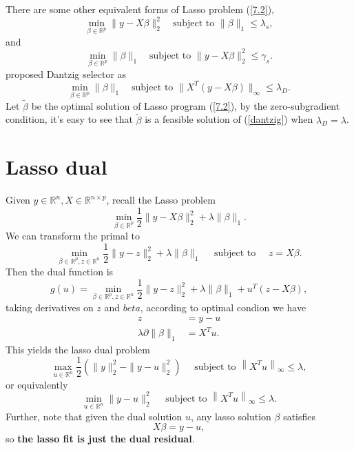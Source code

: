 \documentclass[12pt]{article}
\numberwithin{equation}{section}
\begin{document}
There are some other equivalent forms of Lasso problem (\ref{7.2}),
$$
\min_{\beta \in \mathbb R^p}\|y-X\beta\|_2^2\quad \text{subject to } \|\beta\|_1\leq \lambda_s,
$$
and
$$
\min_{\beta \in \mathbb R^p}\|\beta\|_1\quad \text{subject to } \|y-X\beta\|_2^2\leq \gamma_s.
$$
\citet*{candes2007} proposed Dantzig selector as
\begin{equation}\label{dantzig}
\min_{\beta \in \mathbb R^p}\|\beta\|_1 \quad \text{subject to } \|X^T(y-X\beta)\|_{\infty}\leq \lambda_D.
\end{equation}
Let $\tilde{\beta}$ be the optimal solution of Lasso program (\ref{7.2}), by the zero-subgradient condition, it's easy to see that $\tilde{\beta}$ is a feasible solution of (\ref{dantzig}) when $\lambda_D=\lambda$.
\section{Lasso dual}
Given $y \in \mathbb{R}^{n}, X \in \mathbb{R}^{n \times p}$, recall the Lasso problem
$$
\min _{\beta \in \mathbb{R}^{p}} \frac{1}{2}\|y-X \beta\|_{2}^{2}+\lambda\|\beta\|_{1}.
$$
We can transform the primal to 
$$
\min _{\beta \in \mathbb{R}^{p}, z \in \mathbb{R}^{n}} \frac{1}{2}\|y-z\|_{2}^{2}+\lambda\|\beta\|_{1} \quad \text { subject to } \quad z=X \beta.
$$
Then the dual function is
$$
g(u)=\min _{\beta \in \mathbb{R}^{p}, z \in \mathbb{R}^{n}} \frac{1}{2}\|y-z\|_{2}^{2}+\lambda\|\beta\|_{1}+u^{T}(z-X \beta),
$$
taking derivatives on $z$ and $beta$, according to optimal condion we have
\begin{align*}
z&=y-u\\
\lambda \partial\|\beta\|_1&=X^Tu.
\end{align*}
This yields the lasso dual problem
$$
\max _{u \in \mathbb{R}^{n}} \frac{1}{2}\left(\|y\|_{2}^{2}-\|y-u\|_{2}^{2}\right) \quad \text { subject to }\left\|X^{T} u\right\|_{\infty} \leq \lambda,
$$
or equivalently
$$
\min _{u \in \mathbb{R}^{n}}\|y-u\|_{2}^{2}\quad \text { subject to }\left\|X^{T} u\right\|_{\infty} \leq \lambda.
$$
Further, note that given the dual solution $u$, any lasso solution $\beta$ satisfies
$$
X \beta=y-u,
$$
so \textbf{the lasso fit is just the dual residual}.
\end{document}
